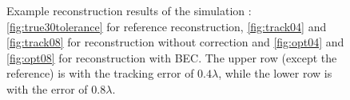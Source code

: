 \begin{figure}	

\setlength{\abovecaptionskip}{-10pt} %
\caption{Example reconstruction results of the simulation : \ref{fig:true30tolerance} for reference reconstruction, \ref{fig:track04} and \ref{fig:track08} for reconstruction without correction and \ref{fig:opt04} and \ref{fig:opt08} for reconstruction with BEC. The upper row (except the reference) is with the tracking error of $0.4 \lambda$, while the lower row is with the error of $0.8 \lambda$.}
\label{fig:recoimg_tolerance}
\setlength{\belowcaptionskip}{-20pt} %
\end{figure}
